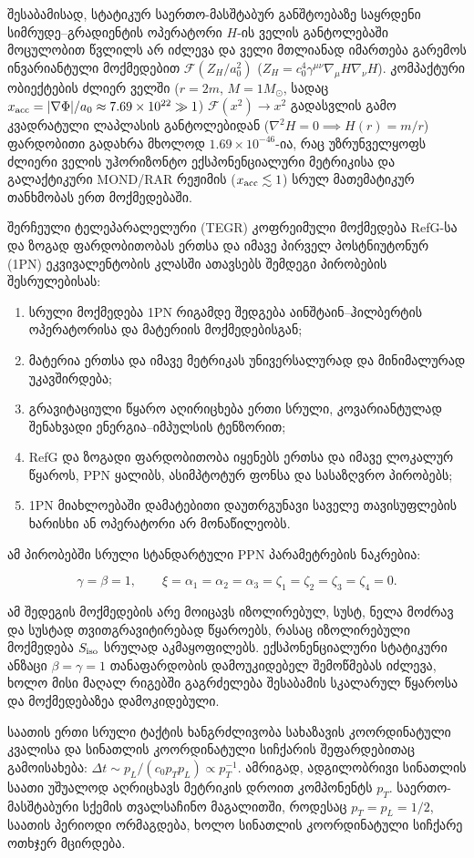 \documentclass[11pt,a4paper]{article}
\begin{document}
\begin{enumerate}[label=\arabic*.]
\[\]
შესაბამისად, სტატიკურ საერთო-მასშტაბურ განშტოებაზე საყრდენი სიმრუდე–გრადიენტის ოპერატორი $H$-ის ველის განტოლებაში მოცულობით წვლილს არ იძლევა და ველი მთლიანად იმართება გარემოს ინვარიანტული მოქმედებით $\mathcal{F}(Z_H/a_0^2)$ ($Z_H = c_0^4\gamma^{\mu\nu}\nabla_\mu H\nabla_\nu H$). კომპაქტური ობიექტების ძლიერ ველში ($r=2m$, $M=1 M_\odot$, სადაც $x_{\rm acc} = |\nabla\Phi|/a_0 \approx 7.69\times 10^{22} \gg 1$) $\mathcal{F}(x^2) \to x^2$ გადასვლის გამო კვადრატული ლაპლასის განტოლებიდან ($\nabla^2 H = 0 \implies H(r) = m/r$) ფარდობითი გადახრა მხოლოდ $1.69\times 10^{-46}$-ია, რაც უზრუნველყოფს ძლიერი ველის უჰორიზონტო ექსპონენციალური მეტრიკისა და გალაქტიკური MOND/RAR რეჟიმის ($x_{\rm acc} \lesssim 1$) სრულ მათემატიკურ თანხმობას ერთ მოქმედებაში.

\end{enumerate}
შერჩეული ტელეპარალელური (TEGR) კოფრეიმული მოქმედება RefG-სა და ზოგად ფარდობითობას ერთსა და იმავე პირველ პოსტნიუტონურ (1PN) ეკვივალენტობის კლასში ათავსებს შემდეგი პირობების შესრულებისას:

\begin{enumerate}[label=\arabic*.]
\item სრული მოქმედება 1PN რიგამდე შედგება აინშტაინ–ჰილბერტის ოპერატორისა და მატერიის მოქმედებისგან;
\item მატერია ერთსა და იმავე მეტრიკას უნივერსალურად და მინიმალურად უკავშირდება;
\item გრავიტაციული წყარო აღირიცხება ერთი სრული, კოვარიანტულად შენახვადი ენერგია–იმპულსის ტენზორით;
\item RefG და ზოგადი ფარდობითობა იყენებს ერთსა და იმავე ლოკალურ წყაროს, PPN ყალიბს, ასიმპტოტურ ფონსა და სასაზღვრო პირობებს;
\item 1PN მიახლოებაში დამატებითი დაუთრგუნავი საველე თავისუფლების ხარისხი ან ოპერატორი არ მონაწილეობს.

\end{enumerate}
ამ პირობებში სრული სტანდარტული PPN პარამეტრების ნაკრებია:

\[
\gamma=\beta=1,\qquad
\xi=\alpha_1=\alpha_2=\alpha_3=\zeta_1=\zeta_2=\zeta_3=\zeta_4=0.
\]

ამ შედეგის მოქმედების არე მოიცავს იზოლირებულ, სუსტ, ნელა მოძრავ და სუსტად თვითგრავიტირებად წყაროებს, რასაც იზოლირებული მოქმედება $S_{\rm iso}$ სრულად აკმაყოფილებს. ექსპონენციალური სტატიკური ანზაცი $\beta=\gamma=1$ თანაფარდობის დამოუკიდებელ შემოწმებას იძლევა, ხოლო მისი მაღალ რიგებში გაგრძელება შესაბამის სკალარულ წყაროსა და მოქმედებაზეა დამოკიდებული.

საათის ერთი სრული ტაქტის ხანგრძლივობა სახაზავის კოორდინატული კვალისა და სინათლის კოორდინატული სიჩქარის შეფარდებითაც გამოისახება: $\Delta t\sim p_L/(c_0p_Tp_L)\propto p_T^{-1}$. ამრიგად, ადგილობრივი სინათლის საათი უშუალოდ აღრიცხავს მეტრიკის დროით კომპონენტს $p_T$. საერთო-მასშტაბური სქემის თვალსაჩინო მაგალითში, როდესაც $p_T=p_L=1/2$, საათის პერიოდი ორმაგდება, ხოლო სინათლის კოორდინატული სიჩქარე ოთხჯერ მცირდება.
\end{document}
